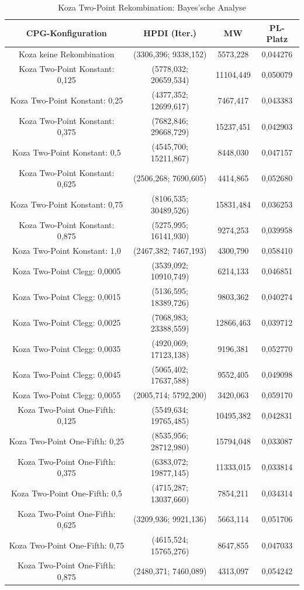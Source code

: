 \begin{table}[H]
	\centering
	\begin{tabular}{c | c | c | c}
		\textbf{CPG-Konfiguration} & \textbf{HPDI (Iter.)} & \textbf{MW} & \textbf{PL-Platz}\\
		\hline
		Koza keine Rekombination & (3306,396; 9338,152) & 5573,228 & 0,044276\\
		\hline
		Koza Two-Point Konstant: 0,125 & (5778,032; 20659,534) & 11104,449 & 0,050079\\
		\hline
		Koza Two-Point Konstant: 0,25 & (4377,352; 12699,617) & 7467,417 & 0,043383\\
		\hline
		Koza Two-Point Konstant: 0,375 & (7682,846; 29668,729) & 15237,451 & 0,042903\\
		\hline
		Koza Two-Point Konstant: 0,5 & (4545,700; 15211,867) & 8448,030 & 0,047157\\
		\hline
		Koza Two-Point Konstant: 0,625 & (2506,268; 7690,605) & 4414,865 & 0,052680\\
		\hline
		Koza Two-Point Konstant: 0,75 & (8106,535; 30489,526) & 15831,484 & 0,036253\\
		\hline
		Koza Two-Point Konstant: 0,875 & (5275,995; 16141,930) & 9274,253 & 0,039958\\
		\hline
		Koza Two-Point Konstant: 1,0 & (2467,382; 7467,193) & 4300,790 & 0,058410\\
		\hline
		Koza Two-Point Clegg: 0,0005 & (3539,092; 10910,749) & 6214,133 & 0,046851\\
		\hline
		Koza Two-Point Clegg: 0,0015 & (5136,595; 18389,726) & 9803,362 & 0,040274\\
		\hline
		Koza Two-Point Clegg: 0,0025 & (7068,983; 23388,559) & 12866,463 & 0,039712\\
		\hline
		Koza Two-Point Clegg: 0,0035 & (4920,069; 17123,138) & 9196,381 & 0,052770\\
		\hline
		Koza Two-Point Clegg: 0,0045 & (5065,402; 17637,588) & 9552,405 & 0,049098\\
		\hline
		Koza Two-Point Clegg: 0,0055 & (2005,714; 5792,200) & 3420,063 & 0,059170\\
		\hline
		Koza Two-Point One-Fifth: 0,125 & (5549,634; 19765,485) & 10495,382 & 0,042831\\
		\hline
		Koza Two-Point One-Fifth: 0,25 & (8535,956; 28712,980) & 15794,048 & 0,033087\\
		\hline
		Koza Two-Point One-Fifth: 0,375 & (6383,072; 19877,145) & 11333,015 & 0,033814\\
		\hline
		Koza Two-Point One-Fifth: 0,5 & (4715,287; 13037,660) & 7854,211 & 0,034314\\
		\hline
		Koza Two-Point One-Fifth: 0,625 & (3209,936; 9921,136) & 5663,114 & 0,051706\\
		\hline
		Koza Two-Point One-Fifth: 0,75 & (4615,524; 15765,276) & 8647,855 & 0,047033\\
		\hline
		Koza Two-Point One-Fifth: 0,875 & (2480,371; 7460,089) & 4313,097 & 0,054242\\
	\end{tabular}
	\label{table:kozaTwoPointBayesian}
	\caption{Koza Two-Point Rekombination: Bayes'sche Analyse}
\end{table}


